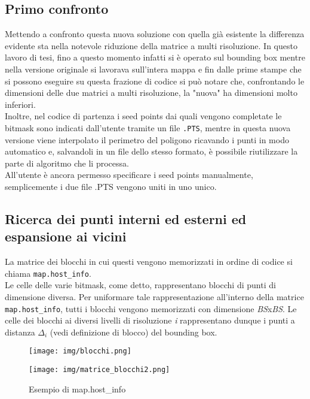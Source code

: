 		\subsection{Primo confronto}
			Mettendo a confronto questa nuova soluzione con quella gi\`{a} esistente la differenza evidente sta nella notevole riduzione della matrice a multi risoluzione. In questo lavoro di tesi, fino a questo momento infatti si \`{e} operato sul bounding box mentre nella versione originale si lavorava sull'intera mappa e fin dalle prime stampe che si possono eseguire su questa frazione di codice si pu\`{o} notare che, confrontando le dimensioni delle due matrici a multi risoluzione, la "nuova" ha dimensioni molto inferiori.\\
			Inoltre, nel codice di partenza i seed points dai quali vengono completate le bitmask sono indicati dall'utente tramite un file \texttt{.PTS}, mentre in questa nuova versione viene interpolato il perimetro del poligono ricavando i punti in modo automatico e, salvandoli in un file dello stesso formato, \`{e} possibile riutilizzare la parte di algoritmo che li processa.\\
			All'utente \`{e} ancora permesso specificare i seed points manualmente, semplicemente i due file .PTS vengono uniti in uno unico.

		\subsection{Ricerca dei punti interni ed esterni ed espansione ai vicini}
			La matrice dei blocchi in cui questi vengono memorizzati in ordine di codice si chiama \texttt{map.host\_info}.\\
			Le celle delle varie bitmask, come detto, rappresentano  blocchi di punti di dimensione diversa. Per uniformare tale rappresentazione all'interno della matrice \texttt{map.host\_info}, tutti i blocchi vengono memorizzati con dimensione \textit{BS}x\textit{BS}. Le celle dei blocchi ai diversi livelli di risoluzione \textit{i} rappresentano dunque i punti a distanza $\Delta_i$ (vedi definizione di blocco) del bounding box.
			\begin{figure}[htbp]
				\centering
				\texttt{[image: img/blocchi.png]}
			\end{figure}
			\begin{figure}[htbp]
				\centering
				\texttt{[image: img/matrice\_blocchi2.png]}
				\caption{Esempio di map.host\_info}
			\end{figure}

